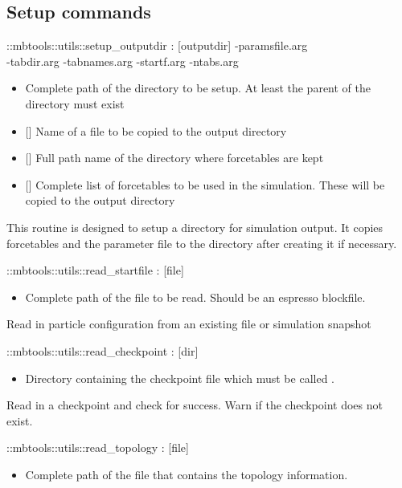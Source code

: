 \subsection{Setup commands}
\begin{code}
  ::mbtools::utils::setup\_outputdir  :  [outputdir] -paramsfile.arg\\
             -tabdir.arg -tabnames.arg -startf.arg -ntabs.arg
\end{code}
\begin{itemize}
\item {} Complete path of the directory to be setup. At
  least the parent of the directory must exist
\item {} [] Name of a file to be copied to the output
  directory
\item {} [] Full path name of the directory where
  forcetables are kept
\item {} [] Complete list of forcetables to be used in the
  simulation. These will be copied to the output directory
\end{itemize}
This routine is designed to setup a directory for simulation
output. It copies forcetables and the parameter file to the directory
after creating it if necessary.
\begin{code}
  ::mbtools::utils::read_startfile : [file]
\end{code}
\begin{itemize}
\item {} Complete path of the file to be read. Should be an
  espresso blockfile.
\end{itemize}
Read in particle configuration from an existing file or simulation
snapshot
\begin{code}
  ::mbtools::utils::read_checkpoint : [dir]
\end{code}
\begin{itemize}
\item {} Directory containing the checkpoint file which must be
  called .
\end{itemize}
Read in a checkpoint and check for success. Warn if the checkpoint
does not exist.
\begin{code}
  ::mbtools::utils::read_topology : [file]
\end{code}
\begin{itemize}
\item {} Complete path of the file that contains the topology information.
\end{itemize}
